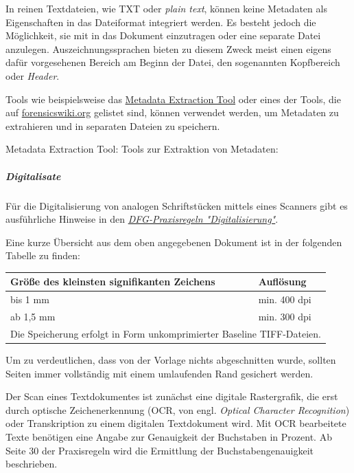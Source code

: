 In reinen Textdateien, wie TXT oder \emph{plain text}, können keine Metadaten als Eigenschaften in das Dateiformat integriert werden. Es besteht jedoch die Möglichkeit, sie mit in das Dokument einzutragen oder eine separate Datei anzulegen. Auszeichnungssprachen bieten zu diesem Zweck meist einen eigens dafür vorgesehenen Bereich am Beginn der Datei, den sogenannten Kopfbereich oder \emph{Header}.

Tools wie beispielsweise das \href{http://meta-extractor.sourceforge.net/}{Metadata Extraction Tool} oder eines der Tools, die auf \href{http://www.forensicswiki.org/wiki/Document_Metadata_Extraction\#Office_Files}{forensicswiki.org} gelistet sind, können verwendet werden, um Metadaten zu extrahieren und in separaten Dateien zu speichern.

\begin{flushleft}
	Metadata Extraction Tool: 
	Tools zur Extraktion von Metadaten: 
\end{flushleft}



\subparagraph{Digitalisate} \label{Digitalisate-Texte} 
Für die Digitalisierung von analogen Schriftstücken mittels eines Scanners gibt es ausführliche Hinweise in den \href{http://www.dfg.de/formulare/12_151/}{\emph{DFG-Praxisregeln "Digitalisierung"}}.

Eine kurze Übersicht aus dem oben angegebenen Dokument ist in der folgenden Tabelle zu finden:

\begin{center}
	\begin{tabular}{p{} l}
		\toprule
		Größe des kleinsten signifikanten Zeichens & Auflösung \\ \midrule
		bis 1 mm & min. 400 dpi \\
		ab 1,5 mm & min. 300 dpi \\ \cmidrule(r){1-2}
		\multicolumn{2}{l}{Die Speicherung erfolgt in Form unkomprimierter Baseline TIFF-Dateien.} \\
		\bottomrule    
	\end{tabular}
\end{center}

Um zu verdeutlichen, dass von der Vorlage nichts abgeschnitten wurde, sollten Seiten immer vollständig mit einem umlaufenden Rand gesichert werden.

Der Scan eines Textdokumentes ist zunächst eine digitale Rastergrafik, die erst durch optische Zeichenerkennung (OCR, von engl. \emph{Optical Character Recognition}) oder Transkription zu einem digitalen Textdokument wird. Mit OCR bearbeitete Texte benötigen eine Angabe zur Genauigkeit der Buchstaben in Prozent. Ab Seite 30 der Praxisregeln wird die Ermittlung der Buchstabengenauigkeit beschrieben.

